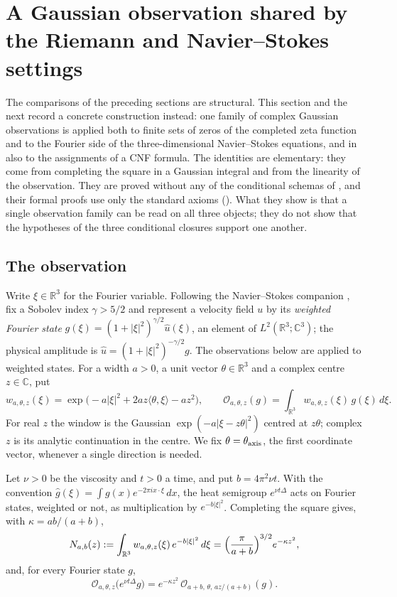 \section{A Gaussian observation shared by the Riemann and Navier--Stokes settings}
\label{sec:gaussian-bridge}

The comparisons of the preceding sections are structural.  This section
and the next record a concrete construction instead: one family of
complex Gaussian observations is applied both to finite sets of zeros of
the completed zeta function and to the Fourier side of the
three-dimensional Navier--Stokes equations, and in
 also to the assignments of a CNF formula.  The
identities are elementary: they come from completing the square in a
Gaussian integral and from the linearity of the observation.  They are
proved without any of the conditional schemas of
, and their formal proofs use
only the standard axioms ().  What they show is
that a single observation family can be read on all three objects; they
do not show that the hypotheses of the three conditional closures
support one another.

\subsection{The observation}

Write \(\xi\in\mathbb R^{3}\) for the Fourier variable.  Following the
Navier--Stokes companion \cite{Tsiokos2026NavierStokes}, fix a Sobolev
index \(\gamma>5/2\) and represent a velocity field \(u\) by its
\emph{weighted Fourier state}
\(g(\xi)=(1+|\xi|^{2})^{\gamma/2}\hat u(\xi)\), an element of
\(L^{2}(\mathbb R^{3};\mathbb C^{3})\); the physical amplitude is
\(\hat u=(1+|\xi|^{2})^{-\gamma/2}g\).  The observations below are
applied to weighted states.  For a width
\(a>0\), a unit vector \(\theta\in\mathbb R^{3}\) and a complex centre
\(z\in\mathbb C\), put
\[
  w_{a,\theta,z}(\xi)
  =\exp\bigl(-a|\xi|^{2}+2az\langle\theta,\xi\rangle-az^{2}\bigr),
  \qquad
  \mathcal O_{a,\theta,z}(g)=\int_{\mathbb R^{3}}w_{a,\theta,z}(\xi)\,g(\xi)\,d\xi .
\]
For real \(z\) the window is the Gaussian
\(\exp(-a|\xi-z\theta|^{2})\) centred at \(z\theta\); complex \(z\) is
its analytic continuation in the centre.  We fix \(\theta=\theta_{\rm
axis}\), the first coordinate vector, whenever a single direction is
needed.

Let \(\nu>0\) be the viscosity and \(t>0\) a time, and put
\(b=4\pi^{2}\nu t\).  With the convention
\(\hat g(\xi)=\int g(x)e^{-2\pi i x\cdot\xi}\,dx\), the heat semigroup
\(e^{\nu t\Delta}\) acts on Fourier states, weighted or not, as
multiplication by \(e^{-b|\xi|^{2}}\).  Completing the square gives,
with \(\kappa=ab/(a+b)\),
\begin{equation}
\label{eq:joint-heat-kernel}
  N_{a,b}(z):=\int_{\mathbb R^{3}}w_{a,\theta,z}(\xi)\,e^{-b|\xi|^{2}}\,d\xi
  =\Bigl(\frac{\pi}{a+b}\Bigr)^{3/2}e^{-\kappa z^{2}},
\end{equation}
and, for every Fourier state \(g\),
\[
  \mathcal O_{a,\theta,z}\bigl(e^{\nu t\Delta}g\bigr)
  =e^{-\kappa z^{2}}\,
    \mathcal O_{a+b,\,\theta,\,az/(a+b)}(g).
\]

